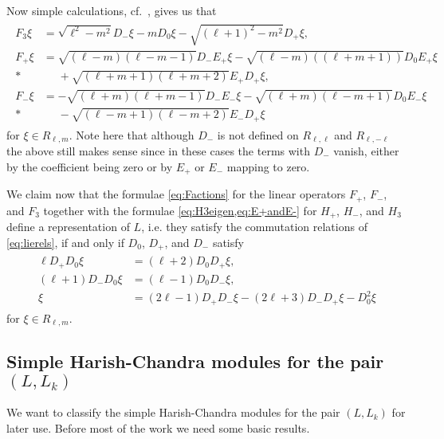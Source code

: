 Now simple calculations, cf.\ , gives us that
\begin{align}\label{eq:Factions}
  \begin{aligned}
    F_3 \xi &= \sqrt{\ell^2-m^2} D_-\xi - m D_0\xi - \sqrt{(\ell+1)^2-m^2}D_+\xi, \\
    F_+ \xi &= \sqrt{(\ell-m)(\ell-m-1)}D_-E_+\xi - \sqrt{(\ell-m)((\ell+m+1))}D_0E_+\xi \\*
    &\phantom{{}={}}{} + \sqrt{(\ell+m+1)(\ell+m+2)}E_+D_+\xi, \\
    F_- \xi &= -\sqrt{(\ell+m)(\ell+m-1)}D_-E_-\xi - \sqrt{(\ell+m)(\ell-m+1)}D_0E_-\xi \\*
    &\phantom{{}={}}{} - \sqrt{(\ell-m+1)(\ell-m+2)}E_-D_+\xi
  \end{aligned}
\end{align}
for $\xi\in R_{\ell,m}$. Note here that although $D_-$ is not defined on $R_{\ell,\ell}$ and $R_{\ell,-\ell}$ the above still makes sense since in these cases the terms with $D_-$ vanish, either by the coefficient being zero or by $E_+$ or $E_-$ mapping to zero.

We claim now that the formulae \cref{eq:Factions} for the linear operators $F_+$, $F_-$, and $F_3$ together with the formulae \cref{eq:H3eigen,eq:E+andE-} for $H_+$, $H_-$, and $H_3$ define a representation of $L$, i.e. they satisfy the commutation relations of \cref{eq:lierels}, if and only if $D_0$, $D_+$, and $D_-$ satisfy
\begin{align}\label{eq:Drels}
  \begin{aligned}
    \ell D_+D_0 \xi &= (\ell+2)D_0 D_+ \xi, \\
    (\ell+1)D_-D_0 \xi &= (\ell-1)D_0D_-\xi, \\
    \xi &= (2\ell-1)D_+D_- \xi - (2\ell+3)D_-D_+\xi - D_0^2\xi
  \end{aligned}
\end{align}
for $\xi\in R_{\ell,m}$. 

\subsection{\texorpdfstring{Simple Harish-Chandra modules for the pair $(L,L_k)$}{Simple Harish-Chandra modules for the pair (L,L\_k)}}\label{sec:simplemodules}

We want to classify the simple Harish-Chandra modules for the pair $(L,L_k)$ for later use. Before most of the work we need some basic results.

